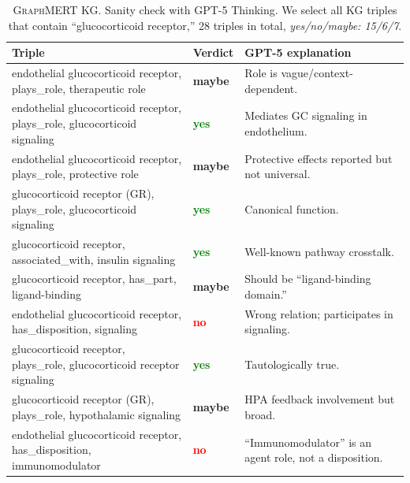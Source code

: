 \documentclass[10pt]{article}
\newcommand{\ours}{\textsc{GraphMERT}\xspace}
\begin{document}
\begin{appendices}
\begin{table}[t]
\centering
\caption{\ours KG. Sanity check with GPT-5 Thinking. We select all KG triples that contain ``glucocorticoid receptor,'' 28 triples in total, \emph{yes/no/maybe: 15/6/7}.}
\label{tab:glm_triples-check-glucocorticoid}
\begin{tabularx}{\linewidth}{
  >{\hsize=1.3\hsize\raggedright\arraybackslash}X  %
  p{3em}                                           %
  >{\hsize=0.7\hsize\raggedright\arraybackslash}X  %
}
\rowcolor{gray!30}
\textbf{Triple} & \textbf{Verdict} & \textbf{GPT-5 explanation} \\
\midrule
endothelial glucocorticoid receptor, plays\_role, therapeutic role & \textcolor{YellowOrange}{\bf maybe} & Role is vague/context-dependent. \\
endothelial glucocorticoid receptor, plays\_role, glucocorticoid signaling & \textcolor{Green}{\bf yes} & Mediates GC signaling in endothelium. \\
endothelial glucocorticoid receptor, plays\_role, protective role & \textcolor{YellowOrange}{\bf maybe} & Protective effects reported but not universal. \\
glucocorticoid receptor (GR), plays\_role, glucocorticoid signaling & \textcolor{Green}{\bf yes} & Canonical function. \\
glucocorticoid receptor, associated\_with, insulin signaling & \textcolor{Green}{\bf yes} & Well-known pathway crosstalk. \\
glucocorticoid receptor, has\_part, ligand-binding & \textcolor{YellowOrange}{\bf maybe} & Should be ``ligand-binding domain.'' \\
endothelial glucocorticoid receptor, has\_disposition, signaling & \textcolor{red}{\bf no} & Wrong relation; participates in signaling. \\
glucocorticoid receptor, plays\_role, glucocorticoid receptor signaling & \textcolor{Green}{\bf yes} & Tautologically true. \\
glucocorticoid receptor (GR), plays\_role, hypothalamic signaling & \textcolor{YellowOrange}{\bf maybe} & HPA feedback involvement but broad. \\
endothelial glucocorticoid receptor, has\_disposition, immunomodulator & \textcolor{red}{\bf no} & ``Immunomodulator'' is an agent role, not a disposition. \\

\end{tabularx}
\end{table}
\end{appendices}
\end{document}
